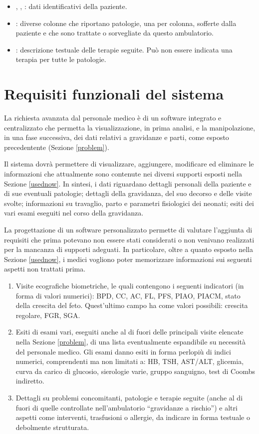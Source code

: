 \begin{itemize}
\item {}, , : dati identificativi della paziente.
\item {}: diverse colonne che riportano patologie, una per colonna, sofferte dalla paziente e che sono trattate o sorvegliate da questo ambulatorio.
\item {}: descrizione testuale delle terapie seguite. Può non essere indicata una terapia per tutte le patologie.
\end{itemize}

\section{Requisiti funzionali del sistema}
\label{functionalrequirements}

La richiesta avanzata dal personale medico è di un software integrato e centralizzato che permetta la visualizzazione, in prima analisi, e la manipolazione, in una fase successiva, dei dati relativi a gravidanze e parti, come esposto precedentente (Sezione \ref{problem}).

Il sistema dovrà permettere di visualizzare, aggiungere, modificare ed eliminare le informazioni che attualmente sono contenute nei diversi supporti esposti nella Sezione \ref{usednow}.
In sintesi, i dati riguardano dettagli personali della paziente e di sue eventuali patologie; dettagli della gravidanza, del suo decorso e delle visite svolte; informazioni su travaglio, parto e parametri fisiologici dei neonati; esiti dei vari esami eseguiti nel corso della gravidanza.

La progettazione di un software personalizzato permette di valutare l'aggiunta di requisiti che prima potevano non essere stati considerati o non venivano realizzati per la mancanza di supporti adeguati.
In particolare, oltre a quanto esposto nella Sezione \ref{usednow}, i medici vogliono poter memorizzare informazioni sui seguenti aspetti non trattati prima.
\begin{enumerate}
\item Visite ecografiche biometriche, le quali contengono  i seguenti indicatori (in forma di valori numerici): BPD, CC, AC, FL, PFS, PIAO, PIACM, stato della crescita del feto. Quest'ultimo campo ha come valori possibili: crescita regolare, FGR, SGA.
\item Esiti di esami vari, eseguiti anche al di fuori delle principali visite elencate nella Sezione \ref{problem}, di una lista eventualmente espandibile su necessità del personale medico. Gli esami danno esiti in forma perlopiù di indici numerici, comprendenti ma non limitati a: HB, TSH, AST/ALT, glicemia, curva da carico di glucosio, sierologie varie, gruppo sanguigno, test di Coombs indiretto.
\item Dettagli su problemi concomitanti, patologie e terapie seguite (anche al di fuori di quelle controllate nell'ambulatorio \enquote{gravidanze a rischio}) e altri aspetti come interventi, trasfusioni o allergie, da indicare in forma testuale o debolmente strutturata.
\end{enumerate}


